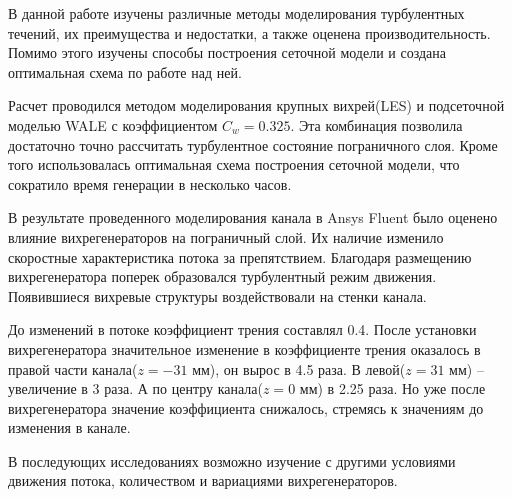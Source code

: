 
В данной работе изучены различные методы моделирования турбулентных течений, их преимущества и недостатки, а также оценена производительность. Помимо этого изучены способы построения сеточной модели и создана оптимальная схема по работе над ней.

Расчет проводился методом моделирования крупных вихрей(LES) и подсеточной моделью WALE с коэффициентом $C_w = 0.325$. Эта комбинация позволила достаточно точно рассчитать турбулентное состояние пограничного слоя. Кроме того использовалась оптимальная схема построения сеточной модели, что сократило время генерации в несколько часов.

В результате проведенного моделирования канала в Ansys Fluent было оценено влияние вихрегенераторов на пограничный слой. Их наличие изменило скоростные характеристика потока за препятствием. Благодаря размещению вихрегенератора поперек образовался турбулентный режим движения. Появившиеся вихревые структуры воздействовали на стенки канала.

До изменений в потоке коэффициент трения составлял 0.4. После установки вихрегенератора значительное изменение в коэффициенте трения оказалось в правой части канала($z = -31$ мм), он вырос в 4.5 раза. В левой($z = 31$ мм) -- увеличение в 3 раза. А по центру канала($z = 0$ мм) в 2.25 раза. Но уже после вихрегенератора значение коэффициента снижалось, стремясь к значениям до изменения в канале.

В последующих исследованиях возможно изучение с другими условиями движения потока, количеством и вариациями вихрегенераторов.